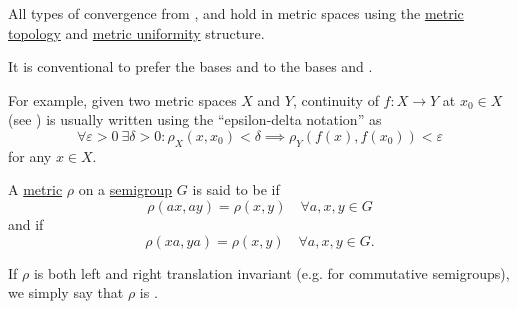 \begin{remark}\label{rem:metric_space_convergence}
  All types of convergence from ,  and  hold in metric spaces using the \hyperref[def:metric_topology]{metric topology} and \hyperref[def:metric_uniformity]{metric uniformity} structure.

  It is conventional to prefer the bases  and  to the bases  and .

  For example, given two metric spaces \( X \) and \( Y \), continuity of \( f: X \to Y \) at \( x_0 \in X \) (see ) is usually written using the \enquote{epsilon-delta notation} as
  \begin{equation*}
    \forall \varepsilon > 0 \ \exists \delta > 0 : \rho_X(x, x_0) < \delta \implies \rho_Y(f(x), f(x_0)) < \varepsilon
  \end{equation*}
  for any \( x \in X \).
\end{remark}

\begin{definition}\label{def:translation_invariant_metric}
  A \hyperref[def:metric_space]{metric} \( \rho \) on a \hyperref[def:semigroup]{semigroup} \( G \) is said to be  if
  \begin{equation*}
    \rho(ax, ay) = \rho(x, y) \quad\forall a, x, y \in G
  \end{equation*}
  and  if
  \begin{equation*}
    \rho(xa, ya) = \rho(x, y) \quad\forall a, x, y \in G.
  \end{equation*}

  If \( \rho \) is both left and right translation invariant (e.g. for commutative semigroups), we simply say that \( \rho \) is .
\end{definition}
